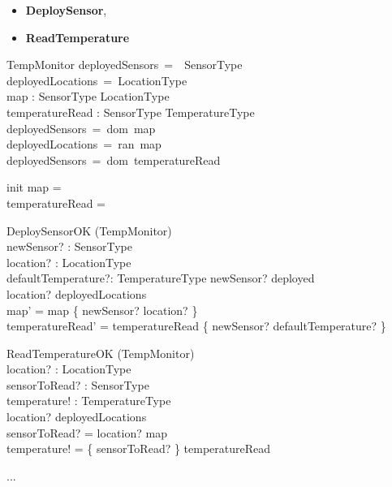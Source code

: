 \documentclass[12pt]{article}
\begin{document}
\begin{itemize}
	\item \textbf{DeploySensor},
	\item \textbf{ReadTemperature}
\end{itemize}

\newpage

\begin{class}{TempMonitor}
\also
deployedSensors~=~~SensorType\\
deployedLocations~=~LocationType\\
map : SensorType \pfun LocationType\\
temperatureRead : SensorType \pfun TemperatureType\\
\where
deployedSensors~=~dom~map\\
deployedLocations~=~ran~map\\
deployedSensors~=~dom~temperatureRead\\
\end{class}
\begin{class}{init}
map = \emptyset\\
temperatureRead = \emptyset
\end{class}
\begin{class}{DeploySensorOK}
\Delta (TempMonitor) \\
newSensor? : SensorType\\
location? : LocationType\\
defaultTemperature?: TemperatureType
\ST
newSensor? \notin deployed\\
location? \notin deployedLocations\\
map' = map \cup \{ newSensor? \mapsto location? \}\\
temperatureRead' = temperatureRead \cup \{ newSensor? \mapsto defaultTemperature? \}
\end{class}
\begin{class}{ReadTemperatureOK}
\Xi (TempMonitor) \\
location? : LocationType\\
sensorToRead? : SensorType\\
temperature! : TemperatureType\\
\ST
location? \in deployedLocations\\
sensorToRead? = {location?} \triangleleft map\\
temperature! = \{ sensorToRead? \} \triangleright  temperatureRead\\
\end{class}
...\\
\end{document}
